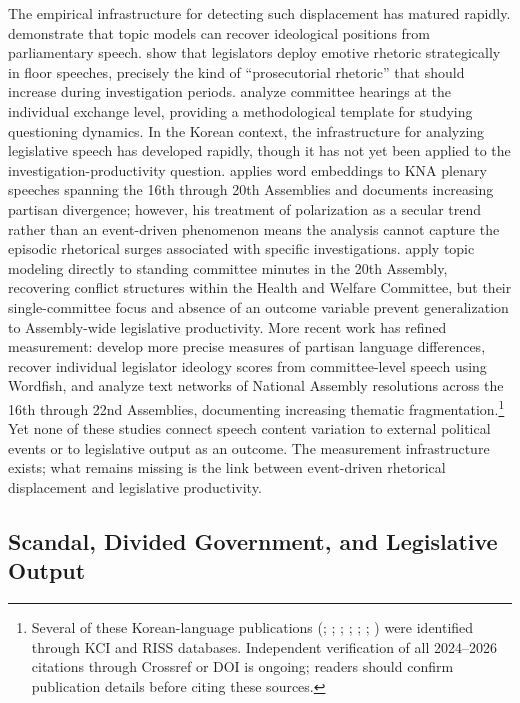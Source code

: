 \documentclass[11pt]{article}
\begin{document}
The empirical infrastructure for detecting such displacement has matured rapidly. \citet{lauderdale2016} demonstrate that topic models can recover ideological positions from parliamentary speech. \citet{osnabugge2021} show that legislators deploy emotive rhetoric strategically in floor speeches, precisely the kind of ``prosecutorial rhetoric'' that should increase during investigation periods. \citet{miller2022} analyze committee hearings at the individual exchange level, providing a methodological template for studying questioning dynamics. In the Korean context, the infrastructure for analyzing legislative speech has developed rapidly, though it has not yet been applied to the investigation-productivity question. \citet{han2022} applies word embeddings to KNA plenary speeches spanning the 16th through 20th Assemblies and documents increasing partisan divergence; however, his treatment of polarization as a secular trend rather than an event-driven phenomenon means the analysis cannot capture the episodic rhetorical surges associated with specific investigations. \citet{leechangkim2020} apply topic modeling directly to standing committee minutes in the 20th Assembly, recovering conflict structures within the Health and Welfare Committee, but their single-committee focus and absence of an outcome variable prevent generalization to Assembly-wide legislative productivity. More recent work has refined measurement: \citet{parksong2024} develop more precise measures of partisan language differences, \citet{chokang2024} recover individual legislator ideology scores from committee-level speech using Wordfish, and \citet{likang2025} analyze text networks of National Assembly resolutions across the 16th through 22nd Assemblies, documenting increasing thematic fragmentation.\footnote{Several of these Korean-language publications (\citealp{parksong2024}; \citealp{chokang2024}; \citealp{likang2025}; \citealp{anpark2025}; \citealp{kimlee2026}; \citealp{park2025}; \citealp{jeon2025}) were identified through KCI and RISS databases. Independent verification of all 2024--2026 citations through Crossref or DOI is ongoing; readers should confirm publication details before citing these sources.} Yet none of these studies connect speech content variation to external political events or to legislative output as an outcome. The measurement infrastructure exists; what remains missing is the link between event-driven rhetorical displacement and legislative productivity.

\subsection{Scandal, Divided Government, and Legislative Output}
\end{document}
